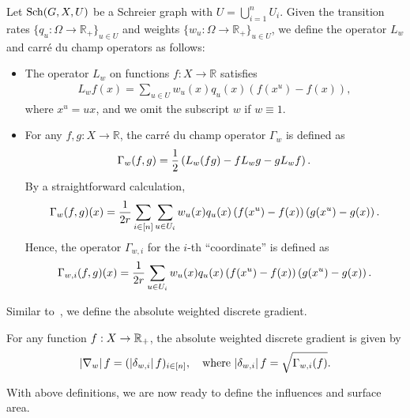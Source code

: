 \begin{definition}
Let $\mathrm{Sch}(G,X,U)$ be a Schreier graph with $U = \bigcup_{i=1}^n U_i$. Given the transition rates $\{q_u: \Omega \to \mathbb{R}_{+}\}_{u \in U}$ and weights $\{w_u: \Omega \to \mathbb{R}_+\}_{u \in U}$, we define the operator $L_w$ and carr\'e du champ operators as follows:
\begin{itemize}
    \item The operator $L_w$ on functions $f: X \to \mathbb{R}$ satisfies
    \begin{align*}
        L_w f(x) = \sum_{u \in U} w_u(x) q_u(x) (f(x^u) - f(x)),
    \end{align*}
    where $x^u = ux$, and we omit the subscript $w$ if $w \equiv 1$.
    \item For any $f,g : X \to \mathbb{R}$, the carr\'e du champ operator $\Gamma_w$ is defined as
    \begin{align*}
        \Gamma_w (f,g) = \frac{1}{2}\left(L_w (fg) - f L_w g - g L_w f\right).
    \end{align*}
    By a straightforward calculation,
    \begin{align*}
        \Gamma_w(f,g)(x) = \frac{1}{2r} \sum_{i \in [n]} \sum_{u \in U_i} w_u(x) q_u(x) \left(f(x^u) - f(x)\right)\left(g(x^u)-g(x)\right).
    \end{align*}
    Hence, the operator $\Gamma_{w,i}$ for the $i$-th ``coordinate'' is defined as
    \begin{align*}
    \Gamma_{w,i} (f,g) (x) = \frac{1}{2 r}\sum_{u \in U_i} w_u(x) q_u(x) \left(f(x^u) - f(x)\right)\left(g(x^u)-g(x)\right).
    \end{align*}
\end{itemize}
\end{definition}

Similar to~, we define the absolute weighted discrete gradient.
\begin{definition}
    For any function $f:X \to \mathbb{R}_+$, the absolute weighted discrete gradient is given by
    \begin{align*}
        \left\vert\nabla_w\right\vert f = (\left\vert\delta_{w,i}\right\vert f)_{i \in [n]}, \quad \text{where $\left\vert\delta_{w,i}\right\vert f = \sqrt{\Gamma_{w,i}(f)}$}.
    \end{align*}
\end{definition}

With above definitions, we are now ready to define the influences and surface area.



